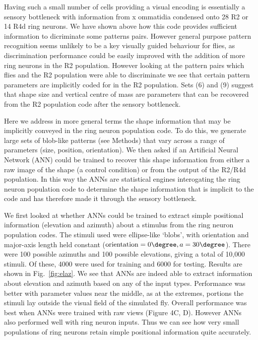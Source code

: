 Having such a small number of cells providing a visual encoding is essentially a sensory bottleneck with information from x ommatidia condensed onto 28 R2 or 14 R4d ring neurons. We have shown above how this code provides sufficient information to dicriminate some patterns pairs. However general purpose pattern recognition seems unlikely to be a key visually guided behaviour for flies, as discrimination performance could be easily improved with the addition of more ring neurons in the R2 population. However looking at the pattern pairs which flies and the R2 population were able to discriminate we see that certain pattern parameters are implicitly coded for in the R2 population. Sets (6) and (9) suggest that shape size and vertical centre of mass are parameters that can be recovered from the R2 population code after the sensory bottleneck.

Here we address in more general terms the shape information that may be implicitly conveyed in the ring neuron population code.
To do this, we generate large sets of blob-like patterns (see Methods) that vary across a range of parameters (size, position, orientation). We then asked if an Artificial Neural Network (ANN) could be trained to recover this shape information from either a raw image of the shape (a control condition) or from the output of the R2/R4d population. In this way the ANNs are statistical engines interogating the ring neuron population code to determine the shape information that is implicit to the code and has therefore made it through the sensory bottleneck. 

We first looked at whether ANNs could be trained to extract simple positional information (elevation and azimuth) about a stimulus from the ring neuron population codes. 
The stimuli used were ellipse-like `blobs', with orientation and major-axis length held constant ($\mathrm{orientation} = 0\degree, a = 30\degree$).
There were 100 possible azimuths and 100 possible elevations, giving a total of 10,000 stimuli.
Of these, 4000 were used for training and 6000 for testing.
Results are shown in Fig.~\ref{fig:elaz}.
We see that ANNs are indeed able to extract information about elevation and azimuth based on any of the input types.
Performance was better with parameter values near the middle, as at the extremes, portions the stimuli lay outside the visual field of the simulated fly.
Overall performance was best when ANNs were trained with raw views (Figure 4C, D). However ANNs also performed well with ring neuron inputs. Thus we can see how very small populations of ring neurons retain simple positional information quite accurately.

